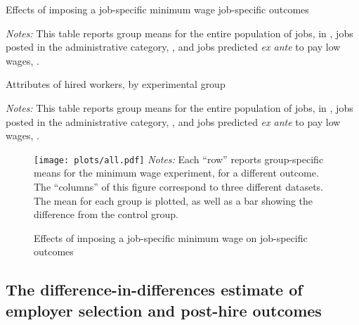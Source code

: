 \begin{table}
  \caption{Effects of imposing a job-specific minimum wage job-specific outcomes \label{tab:all_pretty}} 
  \centering
  \begin{tiny}
    
  \end{tiny}
\begin{minipage}{0.95\linewidth}
{\footnotesize
  \emph{Notes:}
This table reports group means for the entire population of jobs, in \all{}, jobs posted in the administrative category, \admin{}, and jobs predicted \emph{ex ante} to pay low wages, \lpw{}.
}
\end{minipage} 
\end{table}



\begin{table}
    \caption{Attributes of hired workers, by experimental group \label{tab:all_selection_pretty}} 
\begin{tiny}
  
\end{tiny}
\begin{minipage}{0.95\linewidth}
{\footnotesize
\emph{Notes:} This table reports group means for the entire population of jobs, in \all{}, jobs posted in the administrative category, \admin{}, and jobs predicted \emph{ex ante} to pay low wages, \lpw{}.
}
\end{minipage} 
\end{table}

\begin{figure}[h!t]
\centering 
\caption{Effects of imposing a job-specific minimum wage on job-specific outcomes \label{fig:all}} 
\begin{minipage}{0.95\linewidth}
  \texttt{[image: plots/all.pdf]}
  {\footnotesize
    \emph{Notes:} Each ``row'' reports group-specific means for the minimum wage experiment, for a different outcome.
    The ``columns'' of this figure correspond to three different datasets.
    The mean for each group is plotted, as well as a bar showing the difference from the control group.
  }
\end{minipage} 
\end{figure} 


\subsection{The difference-in-differences estimate of employer selection and post-hire outcomes} 

